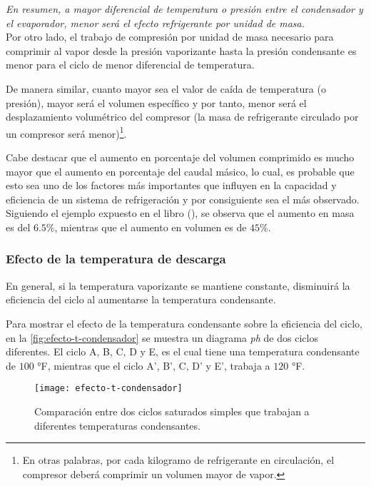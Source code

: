 		
		\textit{En resumen, a mayor diferencial de temperatura o presión entre el condensador y el evaporador, menor será el efecto refrigerante por unidad de masa.}\\
		
		
		Por otro lado, el trabajo de compresión por unidad de masa necesario para comprimir al vapor desde la presión vaporizante hasta la presión condensante es menor para el ciclo de menor diferencial de temperatura.
		
		De manera similar, cuanto mayor sea el valor de caída de temperatura (o presión), mayor será el volumen específico y por tanto, menor será el desplazamiento volumétrico del compresor (la masa de refrigerante circulado por un compresor será menor)\footnote{En otras palabras, por cada kilogramo de refrigerante en circulación, el compresor deberá comprimir un volumen mayor de vapor.}.
		
		
		Cabe destacar que el aumento en porcentaje del volumen comprimido es mucho mayor que el aumento en porcentaje del caudal másico, lo cual, es probable que esto sea uno de los factores más importantes que influyen en la capacidad y eficiencia de un sistema de refrigeración y por consiguiente sea el más observado. Siguiendo el ejemplo expuesto en el libro (\cite[páginas 137 a 140]{dossat2004refrigeracion}), se observa que el aumento en masa es del $6.5\%$, mientras que el aumento en volumen es de $45\%$.
		
	
		\subsubsection{Efecto de la temperatura de descarga}
		
		En general, si la temperatura vaporizante se mantiene constante, disminuirá la eficiencia del ciclo al aumentarse la temperatura condensante.
		
		
		Para mostrar el efecto de la temperatura condensante sobre la eficiencia del ciclo, en la \autoref{fig:efecto-t-condensador} se muestra un diagrama \emph{ph} de dos ciclos diferentes. El ciclo A, B, C, D y E, es el cual tiene una temperatura condensante de $100$ °F, mientras que el ciclo A', B', C, D' y E', trabaja a $120$ °F.
		
		\begin{figure}[H]
			\centering
			\texttt{[image: efecto-t-condensador]}
			\caption{Comparación entre dos ciclos saturados simples que trabajan a diferentes temperaturas condensantes.}
			\label{fig:efecto-t-condensador}
		\end{figure}
		
